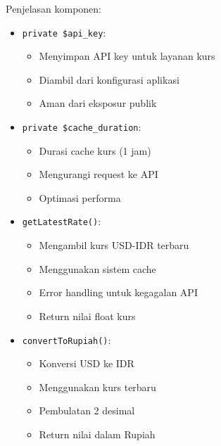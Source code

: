 \documentclass[a4paper]{report}
\begin{document}
Penjelasan komponen:
\begin{itemize}
\item \texttt{private \$api\_key}:
    \begin{itemize}
    \item Menyimpan API key untuk layanan kurs
    \item Diambil dari konfigurasi aplikasi
    \item Aman dari eksposur publik
    \end{itemize}

\item \texttt{private \$cache\_duration}:
    \begin{itemize}
    \item Durasi cache kurs (1 jam)
    \item Mengurangi request ke API
    \item Optimasi performa
    \end{itemize}

\item \texttt{getLatestRate()}:
    \begin{itemize}
    \item Mengambil kurs USD-IDR terbaru
    \item Menggunakan sistem cache
    \item Error handling untuk kegagalan API
    \item Return nilai float kurs
    \end{itemize}

\item \texttt{convertToRupiah()}:
    \begin{itemize}
    \item Konversi USD ke IDR
    \item Menggunakan kurs terbaru
    \item Pembulatan 2 desimal
    \item Return nilai dalam Rupiah
    \end{itemize}
\end{itemize}
\end{document}
